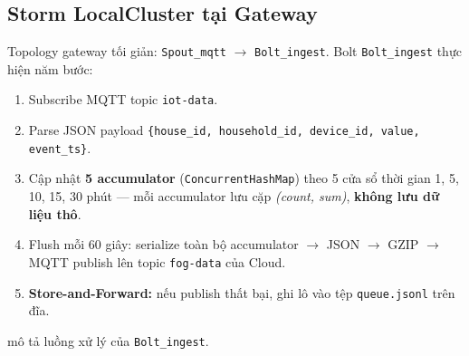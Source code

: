 \documentclass[13pt,a4paper]{report}
\newcommand{\code}[1]{\texttt{\small #1}}
\begin{document}
\subsection{Storm LocalCluster tại Gateway}

Topology gateway tối giản: \code{Spout\_mqtt} $\to$ \code{Bolt\_ingest}. Bolt
\code{Bolt\_ingest} thực hiện năm bước:

\begin{enumerate}
  \item Subscribe MQTT topic \code{iot-data}.
  \item Parse JSON payload \code{\{house\_id, household\_id, device\_id, value, event\_ts\}}.
  \item Cập nhật \textbf{5 accumulator} (\code{ConcurrentHashMap}) theo 5 cửa sổ
        thời gian 1, 5, 10, 15, 30 phút --- mỗi accumulator lưu cặp
        \textit{(count, sum)}, \textbf{không lưu dữ liệu thô}.
  \item Flush mỗi 60 giây: serialize toàn bộ accumulator $\to$ JSON $\to$ GZIP
        $\to$ MQTT publish lên topic \code{fog-data} của Cloud.
  \item \textbf{Store-and-Forward:} nếu publish thất bại, ghi lô vào tệp
        \code{queue.jsonl} trên đĩa.
\end{enumerate}

 mô tả luồng xử lý của \code{Bolt\_ingest}.
\end{document}
